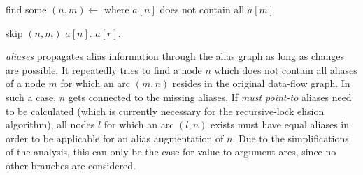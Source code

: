 \begin{algorithmic}
 
  \State {} 
\EndFor
\Repeat
  \State find some $(n, m) \gets$  where $a[n]$ does not contain all $a[m]$

    \State skip $(n, m)$
  \Else
    \State $a[n]$.
        \State $a[r]$.
      \EndFor
    \EndIf
  \EndIf

\EndFunction
\end{algorithmic}
\textit{aliases} propagates alias information through the alias graph as long as changes are possible. It repeatedly tries to find a node $n$ which does not contain all aliases of a node $m$ for which an arc $(m, n)$ resides in the original data-flow graph. In such a case, $n$ gets connected to the missing aliases. If \textit{must point-to} aliases need to be calculated (which is currently necessary for the recursive-lock elision algorithm), all nodes $l$ for which an arc $(l, n)$ exists must have equal aliases in order to be applicable for an alias augmentation of $n$. Due to the simplifications of the analysis, this can only be the case for value-to-argument arcs, since no other branches are considered. 

